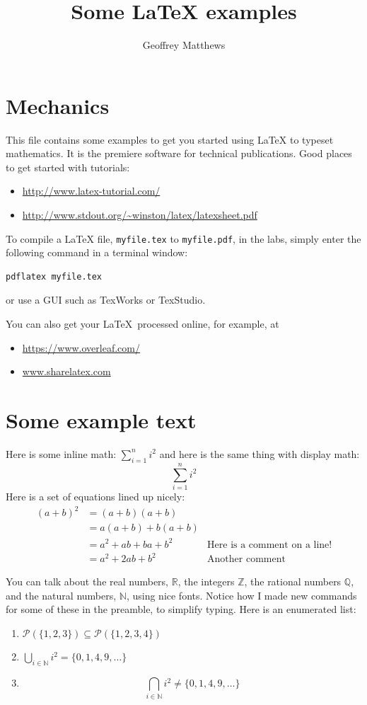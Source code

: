 \documentclass{article}
\title{Some \LaTeX{} examples}
\author{Geoffrey Matthews}
\newcommand{\R}{\mathbb{R}}
\newcommand{\N}{\mathbb{N}}
\begin{document}
\maketitle

\section{Mechanics}
This file contains some examples to get you started using \LaTeX{} to
typeset mathematics.  It is the premiere software for technical
publications.  Good places to get started with tutorials: 
\begin{itemize}
\item \url{http://www.latex-tutorial.com/}
\item \url{http://www.stdout.org/~winston/latex/latexsheet.pdf}
\end{itemize}

To compile a \LaTeX{} file, {\tt myfile.tex} to {\tt myfile.pdf}, 
in the labs, simply enter the
following command in a terminal window:
\begin{Verbatim}[frame=single]
pdflatex myfile.tex
\end{Verbatim}
or use a GUI such as TexWorks or TexStudio.

You can also get your \LaTeX\ processed online, for example, at
\begin{itemize}
\item \url{https://www.overleaf.com/}
\item \url{www.sharelatex.com}
\end{itemize}


\section{Some example text}
Here is some inline math:  $\sum_{i=1}^{n} i^2$ and
here is the same thing with display math:
\[
\sum_{i=1}^{n} i^2
\]
Here is a set of equations lined up nicely:
\begin{align*}
(a+b)^2 &= (a+b)(a+b) \\
        &= a(a+b) + b(a+b) \\
        &= a^2 + ab + ba + b^2  & \mbox{Here is a comment on a line!}\\
        &= a^2 + 2ab + b^2      & \mbox{Another comment}
\end{align*}

You can talk about the real numbers, $\R$, the integers $\mathbb{Z}$, the
rational numbers $\mathbb{Q}$, and the natural numbers,
$\N$, using nice fonts.  Notice how I made new commands for some of these in
the preamble, to simplify typing.
Here is an enumerated list:
\begin{enumerate}

\item $\mathcal{P}(\{1,2,3\}) \subseteq \mathcal{P}(\{1,2,3,4\})$

\item
$
\bigcup_{i\in\N}i^2 = \{0,1,4,9,\ldots\}
$

\item
\[
\bigcap_{i\in\N}i^2 \not= \{0,1,4,9,\ldots\}
\]

\end{enumerate}
\end{document}
